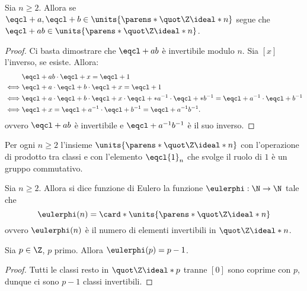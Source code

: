 \begin{proposition}\label{prodotto_invertibili_invertibile}
    Sia $n \geq 2$. Allora se $\eqcl+{a}, \eqcl+{b} \in \units{\parens*{\Zmod{n}}}$ segue che $\eqcl+{ab} \in \units{\parens*{\Zmod{n}}}$.
\end{proposition}
\begin{proof}
    Ci basta dimostrare che $\eqcl+{ab}$ è invertibile modulo $n$. Sia $[x]$ l'inverso, se esiste. Allora:
    \begin{alignat*}{1}
        &\eqcl+{ab}\cdot\eqcl+{x} = \eqcl+{1} \\
        \iff &\eqcl+{a} \cdot \eqcl+{b} \cdot \eqcl+{x} = \eqcl+{1} \\
        \iff &\eqcl+{a} \cdot \eqcl+{b} \cdot \eqcl+{x} \cdot \eqcl+*{a^{-1}} \cdot \eqcl+*{b^{-1}} = \eqcl+{a^{-1}} \cdot \eqcl+{b^{-1}} \\
        \iff &\eqcl+{x} = \eqcl+{a^{-1}} \cdot \eqcl+{b^{-1}} = \eqcl+{a^{-1}b^{-1}}.
    \end{alignat*}
    ovvero $\eqcl+{ab}$ è invertibile e $\eqcl+{a^{-1}b^{-1}}$ è il suo inverso.
\end{proof}

\begin{proposition}\label{Z(n)*_gruppo}
    Per ogni $n \geq 2$ l'insieme $\units{\parens*{\Zmod{n}}}$ con l'operazione di prodotto tra classi e con l'elemento $\eqcl{1}_n$ che svolge il ruolo di $1$ è un gruppo commutativo.
\end{proposition}

\begin{definition}
    Sia $n \geq 2$. Allora si dice funzione di Eulero la funzione $\eulerphi : \N \to \N$ tale che \begin{equation}
        \eulerphi(n) = \card*{\units{\parens*{\Zmod{n}}}}
    \end{equation}
    ovvero $\eulerphi(n)$ è il numero di elementi invertibili in $\Zmod{n}$.
\end{definition}

\begin{proposition}
    Sia $p \in \Z$, $p$ primo. Allora $\eulerphi(p) = p - 1$. 
\end{proposition}
\begin{proof}
    Tutti le classi resto in $\Zmod{p}$ tranne $[0]$ sono coprime con $p$, dunque ci sono $p-1$ classi invertibili.
\end{proof}

